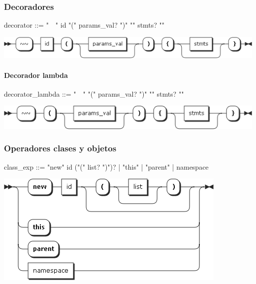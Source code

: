 \subsubsection{Decoradores}
\begin{myverbatim}
decorator ::= "~~" id "(" params_val? ")" "{" stmts? "}"
\end{myverbatim}
\begin{center}
\includegraphics[scale=0.5]{diagram/decorator.png} \\
\end{center}
\paragraph{Decorador lambda}
\begin{myverbatim}
decorator_lambda ::= "~~" "(" params_val? ")" "{" stmts? "}"
\end{myverbatim}
\begin{center}
\includegraphics[scale=0.5]{diagram/function_decorator.png} \\
\end{center}




\pagebreak
\subsubsection{Operadores clases y objetos}
\begin{multicols}{2}
\begin{myverbatim}      
class_exp ::=  "new" id ("(" list? ")")?
            |  "this" 
            |  "parent"
            |  namespace
\end{myverbatim}  
\columnbreak	
\begin{center}
\includegraphics[scale=0.5]{diagram/class_exp.png} \\
\end{center}
\end{multicols}

